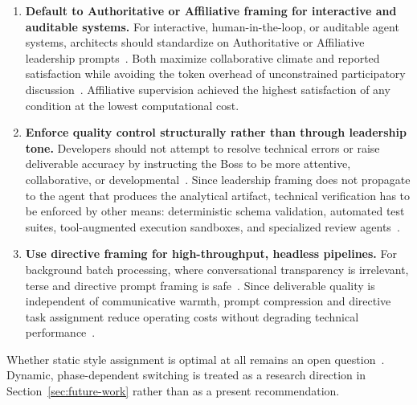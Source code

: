 \begin{enumerate}
    \item \textbf{Default to Authoritative or Affiliative framing for interactive and auditable systems.}
    For interactive, human-in-the-loop, or auditable agent systems, architects should standardize on Authoritative or Affiliative leadership prompts~\cite{goleman2000leadership, amershi2019humanaiinteraction, almutairi2025taifaautomatedfeedback}.
    Both maximize collaborative climate and reported satisfaction while avoiding the token overhead of unconstrained participatory discussion~\cite{zhang2024cutcrapeconomicalcommunication, wageman2005teamdiagnosticsurvey}.
    Affiliative supervision achieved the highest satisfaction of any condition at the lowest computational cost.

    \item \textbf{Enforce quality control structurally rather than through leadership tone.}
    Developers should not attempt to resolve technical errors or raise deliverable accuracy by instructing the Boss to be more attentive, collaborative, or developmental~\cite{kwak2026leadershipcoordinationcontrolbehavioral}.
    Since leadership framing does not propagate to the agent that produces the analytical artifact, technical verification has to be enforced by other means: deterministic schema validation, automated test suites, tool-augmented execution sandboxes, and specialized review agents~\cite{qian2024chatdevcommunicativeagentssoftware, hong2024metagptmetaprogrammingmultiagent, chen2025multiagentasjudgealigningllmagentbasedautomated}.

    \item \textbf{Use directive framing for high-throughput, headless pipelines.}
    For background batch processing, where conversational transparency is irrelevant, terse and directive prompt framing is safe~\cite{goleman2000leadership, hong2024metagptmetaprogrammingmultiagent}.
    Since deliverable quality is independent of communicative warmth, prompt compression and directive task assignment reduce operating costs without degrading technical performance~\cite{zhang2024cutcrapeconomicalcommunication, kwak2026leadershipcoordinationcontrolbehavioral}.
\end{enumerate}

Whether static style assignment is optimal at all remains an open question~\cite{dang2025multiagentcollaborationevolvingorchestration, wang2025agentdropoutdynamicagentelimination}. 
Dynamic, phase-dependent switching is treated as a research direction in Section~\ref{sec:future-work} rather than as a present recommendation.

